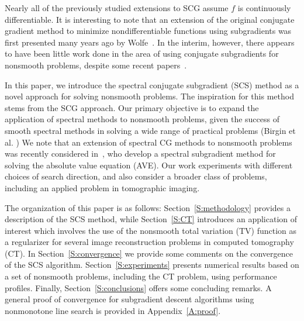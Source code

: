 \documentclass[]{interact}
\theoremstyle{plain}%
\theoremstyle{definition}
\theoremstyle{remark}
\begin{document}

Nearly all of the previously studied extensions to SCG assume {$f$ is continuously differentiable}. It is interesting to note that an extension of the original conjugate gradient method to minimize nondifferentiable functions using subgradients was first presented many years ago by Wolfe~\cite{wolfe74,wolfe75}.  In the interim, however, there appears to have been little work done in the area of using conjugate subgradients for nonsmooth problems, despite some recent papers~\cite{NT14,KSM19,RAR23}.


{In this paper, we introduce the spectral conjugate subgradient (SCS) method as a novel approach for solving nonsmooth problems. The inspiration for this method stems from the SCG approach. Our primary objective is to expand the application of spectral methods to nonsmooth problems, given the success of smooth spectral methods in solving a wide range of practical problems (Birgin et al. \cite{Bmr09, Bmr14})} We note that an extension of spectral CG methods to nonsmooth problems was recently considered in~\cite{RAR23}, who develop a spectral subgradient method for solving the absolute value equation (AVE). Our work experiments with different choices of search direction, and also consider a broader class of problems, including an applied problem in tomographic imaging.

{The organization of this paper is as follows: Section~\ref{S:methodology} provides a description of the SCS method, while Section~\ref{S:CT} introduces an application of interest which involves the use of the nonsmooth total variation (TV) function as a regularizer for several image reconstruction problems in computed tomography (CT). In Section~\ref{S:convergence} we provide some comments on the convergence of the SCS algorithm. Section~\ref{S:experiments} presents numerical results based on a set of nonsmooth problems, including the CT problem, using performance profiles. Finally, Section~\ref{S:conclusions} offers some concluding remarks}. A general proof of convergence for subgradient descent algorithms using nonmonotone line search is provided in Appendix~\ref{A:proof}.
\end{document}
